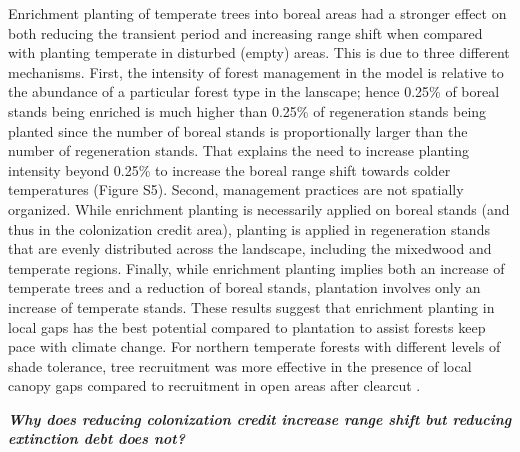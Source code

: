 Enrichment planting of temperate trees into boreal areas had a stronger
effect on both reducing the transient period and increasing range shift
when compared with planting temperate in disturbed (empty) areas. This
is due to three different mechanisms. First, the intensity of forest
management in the model is relative to the abundance of a particular
forest type in the lanscape; hence 0.25\% of boreal stands being
enriched is much higher than 0.25\% of regeneration stands being planted
since the number of boreal stands is proportionally larger than the
number of regeneration stands. That explains the need to increase
planting intensity beyond 0.25\% to increase the boreal range shift
towards colder temperatures (Figure S5). Second, management practices
are not spatially organized. While enrichment planting is necessarily
applied on boreal stands (and thus in the colonization credit area),
planting is applied in regeneration stands that are evenly distributed
across the landscape, including the mixedwood and temperate regions.
Finally, while enrichment planting implies both an increase of temperate
trees and a reduction of boreal stands, plantation involves only an
increase of temperate stands. These results suggest that enrichment
planting in local gaps has the best potential compared to plantation to
assist forests keep pace with climate change. For northern temperate
forests with different levels of shade tolerance, tree recruitment was
more effective in the presence of local canopy gaps compared to
recruitment in open areas after clearcut \citep{LePage2000}.

\textbf{\emph{Why does reducing colonization credit increase range shift
but reducing extinction debt does not?}}

